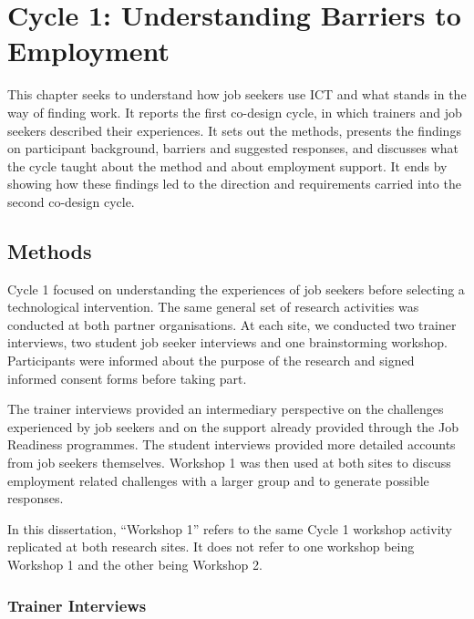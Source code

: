 \chapter{Cycle 1: Understanding Barriers to Employment}
\label{sec:barriers-raised}

\begin{chapterintro}
This chapter seeks to understand how job seekers use ICT and what stands in the way of finding work. It reports the first co-design cycle, in which trainers and job seekers described their experiences. It sets out the methods, presents the findings on participant background, barriers and suggested responses, and discusses what the cycle taught about the method and about employment support. It ends by showing how these findings led to the direction and requirements carried into the second co-design cycle.
\end{chapterintro}


\section{Methods}

Cycle 1 focused on understanding the experiences of job seekers before selecting a technological intervention. The same general set of research activities was conducted at both partner organisations. At each site, we conducted two trainer interviews, two student job seeker interviews and one brainstorming workshop. Participants were informed about the purpose of the research and signed informed consent forms before taking part.

The trainer interviews provided an intermediary perspective on the challenges experienced by job seekers and on the support already provided through the Job Readiness programmes. The student interviews provided more detailed accounts from job seekers themselves. Workshop 1 was then used at both sites to discuss employment related challenges with a larger group and to generate possible responses.

In this dissertation, ``Workshop 1'' refers to the same Cycle 1 workshop activity replicated at both research sites. It does not refer to one workshop being Workshop 1 and the other being Workshop 2.


\subsection{Trainer Interviews}

